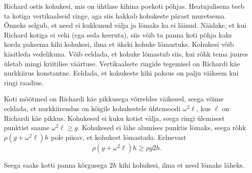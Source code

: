 \setAuthor{}

Richard ostis kohukesi, mis on ühtlase kihina poekoti põhjas. Heatujulisena teeb
ta kotiga vertikaalseid ringe, aga siis hakkab kohukeste pärast muretsema. Õnneks
selgub, et need ei kukkunud välja ja lömaks ka ei läinud. Näidake, et kui Richard
kotiga ei vehi (ega seda keeruta), siis võib ta panna koti põhja kaks korda
paksema kihi kohukesi, ilma et ükski kohuke lömastuks. Kohukesi võib käsitleda
vedelikuna. Võib eeldada, et kohuke lömastub siis, kui rõhk tema juures ületab
mingi kriitilise väärtuse. Vertikaalsete ringide tegemisel on Richardi käe
nurkkiirus konstantne. Eeldada, et kohukeste kihi paksus on palju väiksem kui
ringi raadius.


\hint

\solu
Koti mõõtmed on Richardi käe pikkusega võrreldes väikesed, seega võime eeldada, et nurkkiirendus on kõigile kohukestele ühtemoodi $\omega^2 \ell$, kus $\ell$ on Richardi käe pikkus. Kohukesed ei kuku kotist välja, seega ringi ülemisest punktist saame $\omega^2\ell\geq g$. Kohukesed ei lähe alumises punktis lömaks, seega rõhk $\rho (g+\omega^2 \ell) h$ pole piisav, et kohukest lömastada. Eelnevast
\[\rho (g+\omega^2 \ell) h\geq \rho g 2h.\]

Seega saaks kotti panna kõrgusega $2h$ kihi kohukesi, ilma et need lömaks läheks.
\probend